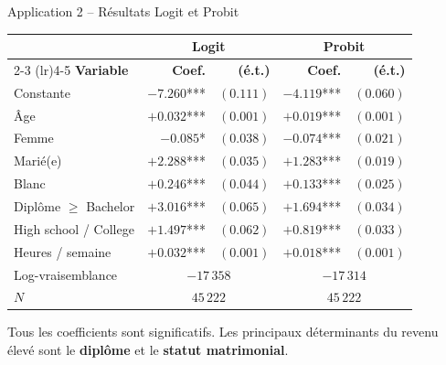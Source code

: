 \documentclass[11pt,aspectratio=169]{beamer}
\begin{document}
\begin{frame}{Application 2 -- Résultats Logit et Probit}

\begin{center}
    \scriptsize
    \renewcommand{\arraystretch}{1.2}
    \begin{tabular}{lrrrr}
        \toprule
        & \multicolumn{2}{c}{\textbf{Logit}} & \multicolumn{2}{c}{\textbf{Probit}} \\
        \cmidrule(lr){2-3} \cmidrule(lr){4-5}
        \textbf{Variable} & \textbf{Coef.} & \textbf{(é.t.)} & \textbf{Coef.} & \textbf{(é.t.)} \\
        \midrule
        Constante & $-7.260$*** & $(0.111)$ & $-4.119$*** & $(0.060)$ \\
        Âge & $+0.032$*** & $(0.001)$ & $+0.019$*** & $(0.001)$ \\
        Femme & $-0.085$* & $(0.038)$ & $-0.074$*** & $(0.021)$ \\
        Marié(e) & $+2.288$*** & $(0.035)$ & $+1.283$*** & $(0.019)$ \\
        Blanc & $+0.246$*** & $(0.044)$ & $+0.133$*** & $(0.025)$ \\
        Diplôme $\geq$ Bachelor & $+3.016$*** & $(0.065)$ & $+1.694$*** & $(0.034)$ \\
        High school / College & $+1.497$*** & $(0.062)$ & $+0.819$*** & $(0.033)$ \\
        Heures / semaine & $+0.032$*** & $(0.001)$ & $+0.018$*** & $(0.001)$ \\
        \midrule
        Log-vraisemblance & \multicolumn{2}{c}{$-17\,358$} & \multicolumn{2}{c}{$-17\,314$} \\
        $N$ & \multicolumn{2}{c}{$45\,222$} & \multicolumn{2}{c}{$45\,222$} \\
        \bottomrule
    \end{tabular}
\end{center}

{\small Tous les coefficients sont significatifs. Les principaux
déterminants du revenu élevé sont le \textbf{diplôme} et le
\textbf{statut matrimonial}.}

\end{frame}
\end{document}
